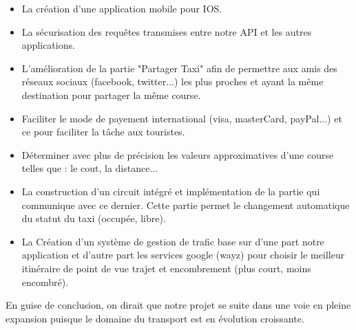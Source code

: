 {\begin{itemize}
\item ‌La création d’une application mobile pour IOS.
\item ‌‌La sécurisation des requêtes transmises entre notre API et les autres applications.
\item ‌‌L’amélioration de la partie "Partager Taxi" afin de permettre aux amis des réseaux sociaux (facebook, twitter...) les plus proches et ayant la même destination pour partager la même course.
\item ‌‌Faciliter le mode de payement international (visa, masterCard, payPal...) et ce pour faciliter la tâche aux touristes.
\item ‌‌Déterminer avec plus de précision les valeurs approximatives d'une course telles que : le cout, la distance...
\item ‌‌La construction d’un circuit intégré et implémentation de la partie qui communique avec ce dernier. Cette partie permet le changement automatique du statut du taxi (occupée, libre).
\item ‌‌La Création d’un système de gestion de trafic base sur d'une part notre application et d'autre part les services google (wayz) pour choisir le meilleur itinéraire de point de vue trajet et encombrement (plus court, moins encombré).\\
\end{itemize}

En guise de conclusion, on dirait que notre projet se suite dans une voie en pleine expansion puisque le domaine du transport est en évolution croissante.




}
